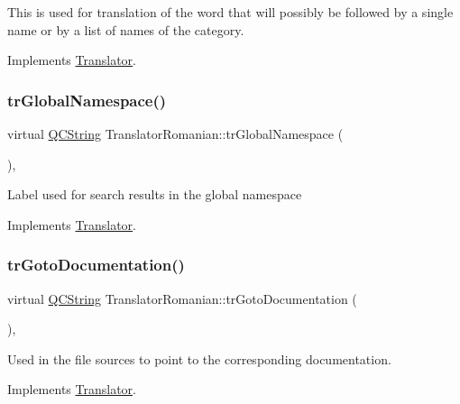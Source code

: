 This is used for translation of the word that will possibly be followed by a single name or by a list of names of the category. 

Implements \mbox{\hyperlink{class_translator}{Translator}}.

\mbox{\label{class_translator_romanian_a161f8e0193f7477b1d1802dea863eab9}} 
\subsubsection{\texorpdfstring{trGlobalNamespace()}{trGlobalNamespace()}}
{\footnotesize\ttfamily virtual \mbox{\hyperlink{class_q_c_string}{Q\+C\+String}} Translator\+Romanian\+::tr\+Global\+Namespace (\begin{DoxyParamCaption}{ }\end{DoxyParamCaption})\hspace{0.3cm}{\ttfamily [inline]}, {\ttfamily [virtual]}}

Label used for search results in the global namespace 

Implements \mbox{\hyperlink{class_translator}{Translator}}.

\mbox{\label{class_translator_romanian_abaea4cbda1cab5dc28e11ed8892b483f}} 
\subsubsection{\texorpdfstring{trGotoDocumentation()}{trGotoDocumentation()}}
{\footnotesize\ttfamily virtual \mbox{\hyperlink{class_q_c_string}{Q\+C\+String}} Translator\+Romanian\+::tr\+Goto\+Documentation (\begin{DoxyParamCaption}{ }\end{DoxyParamCaption})\hspace{0.3cm}{\ttfamily [inline]}, {\ttfamily [virtual]}}

Used in the file sources to point to the corresponding documentation. 

Implements \mbox{\hyperlink{class_translator}{Translator}}.

